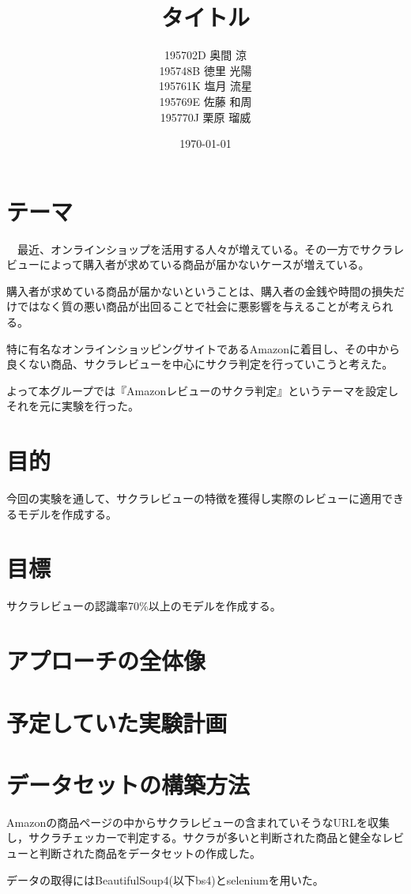 \documentclass[a4paper,11pt,titlepage]{jsarticle}
\title{タイトル}
\author{195702D  奥間 涼\\195748B 徳里 光陽\\195761K 塩月 流星\\195769E 佐藤 和周\\195770J 栗原 瑠威}
\date{\today}
\begin{document}
\maketitle
\tableofcontents
\clearpage
\section{テーマ}
　最近、オンラインショップを活用する人々が増えている。その一方でサクラレビューによって購入者が求めている商品が届かないケースが増えている。

購入者が求めている商品が届かないということは、購入者の金銭や時間の損失だけではなく質の悪い商品が出回ることで社会に悪影響を与えることが考えられる。

特に有名なオンラインショッピングサイトであるAmazonに着目し、その中から良くない商品、サクラレビューを中心にサクラ判定を行っていこうと考えた。

よって本グループでは『Amazonレビューのサクラ判定』というテーマを設定しそれを元に実験を行った。

\section{目的}
今回の実験を通して、サクラレビューの特徴を獲得し実際のレビューに適用できるモデルを作成する。

\section{目標}
サクラレビューの認識率70\%以上のモデルを作成する。

\section{アプローチの全体像}

\section{予定していた実験計画}

\section{データセットの構築方法}
Amazonの商品ページの中からサクラレビューの含まれていそうなURLを収集し，サクラチェッカーで判定する。サクラが多いと判断された商品と健全なレビューと判断された商品をデータセットの作成した。

データの取得にはBeautifulSoup4(以下bs4)とseleniumを用いた。
\end{document}
